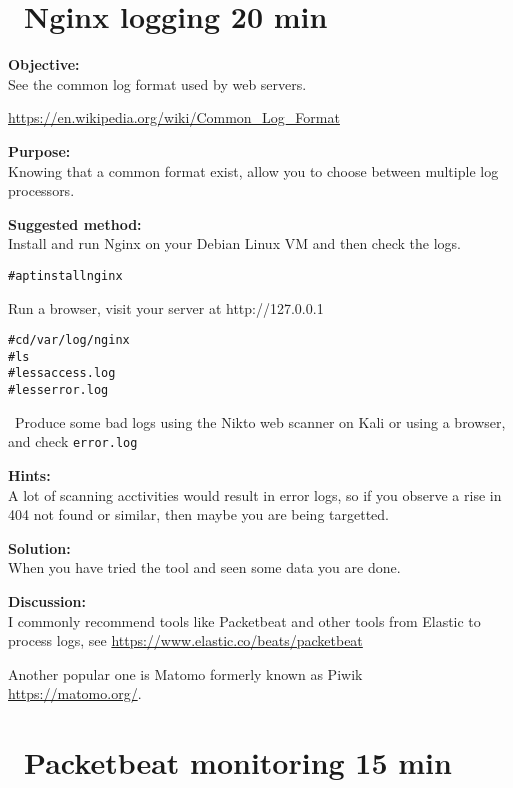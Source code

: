 \documentclass[a4paper,11pt,notitlepage]{report}
\begin{document}
\chapter{\faExclamationTriangle\ Nginx logging 20 min}
\label{ex:nginx-logging}

{\bf Objective:}\\
See the common log format used by web servers.

\url{https://en.wikipedia.org/wiki/Common_Log_Format}


{\bf Purpose:}\\
Knowing that a common format exist, allow you to choose between multiple log processors.


{\bf Suggested method:}\\
Install and run Nginx on your Debian Linux VM and then check the logs.

\begin{alltt}
# apt install nginx
\end{alltt}

Run a browser, visit your server at http://127.0.0.1

\begin{alltt}
# cd /var/log/nginx
# ls
# less access.log
# less error.log
\end{alltt}

\faInfoCircle\
Produce some bad logs using the Nikto web scanner on Kali or using a browser, and check \verb+error.log+


{\bf Hints:}\\
A lot of scanning acctivities would result in error logs, so if you observe a rise in 404 not found or similar, then maybe you are being targetted.

{\bf Solution:}\\
When you have tried the tool and seen some data you are done.

{\bf Discussion:}\\
I commonly recommend tools like Packetbeat and other tools from Elastic to process logs, see \url{https://www.elastic.co/beats/packetbeat}

Another popular one is Matomo formerly known as Piwik\\
\url{https://matomo.org/}.


\chapter{\faInfoCircle\  Packetbeat monitoring 15 min}
\label{ex:packetbeat}
\end{document}

